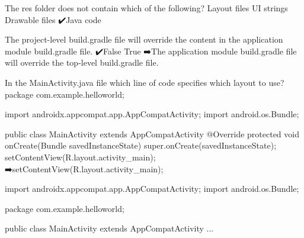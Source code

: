         The res folder does not contain which of the following?
            Layout files
            UI strings
            Drawable files
            ✔️Java code

        The project-level build.gradle file will override the content in the application module build.gradle file.
            ✔️False
            True
            ➡️The application module build.gradle file will override the top-level build.gradle file.

        In the MainActivity.java file which line of code specifies which layout to use?
            package com.example.helloworld;
            
            import androidx.appcompat.app.AppCompatActivity;
            import android.os.Bundle;
            
            public class MainActivity extends AppCompatActivity {
                @Override
                protected void onCreate(Bundle savedInstanceState) {
                    super.onCreate(savedInstanceState);
                    setContentView(R.layout.activity_main);
                }
            }
                ➡️setContentView(R.layout.activity_main);
            
                import androidx.appcompat.app.AppCompatActivity;
                import android.os.Bundle;

                package com.example.helloworld;

                public class MainActivity extends AppCompatActivity {
                ...
                }